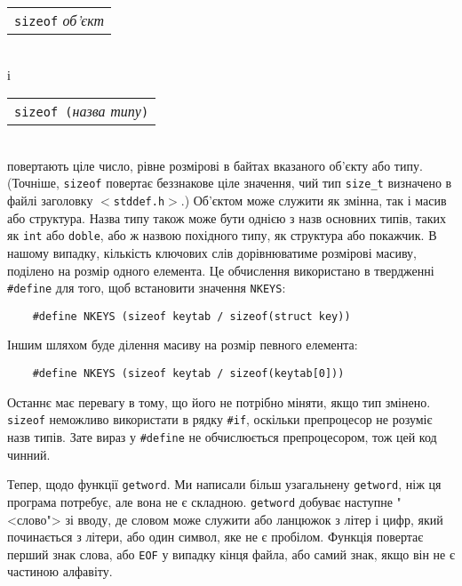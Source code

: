\documentclass[a4paper,12pt]{book}
\begin{document}
  \vspace{12pt}
  \begin{tabular}{l}
  \texttt{sizeof} \textit{об'єкт} \\
  \end{tabular}
  \vspace{12pt}
  \\
  і

  \vspace{12pt}
  \begin{tabular}{l}
  \texttt{sizeof (}\textit{назва типу}\texttt{)}
  \end{tabular}
  \vspace{12pt}
  \\
  повертають ціле число, рівне розмірові в байтах вказаного об'єкту або типу. (Точніше,
  \texttt{sizeof} повертає беззнакове ціле значення, чий тип \texttt{size\_t} визначено в
  файлі заголовку \texttt{\mbox{$<$}stddef.h\mbox{$>$}}.) Об'єктом може служити як змінна,
  так і масив або структура. Назва типу також може бути однією з назв основних типів,
  таких як \texttt{int} або \texttt{doble}, або ж назвою похідного типу, як структура або
  покажчик. В нашому випадку, кількість ключових слів дорівнюватиме розмірові масиву,
  поділено на розмір одного елемента. Це обчислення використано в твердженні
  \texttt{\#define} для того, щоб встановити значення \texttt{NKEYS}:
  \begin{verbatim}
    #define NKEYS (sizeof keytab / sizeof(struct key))
  \end{verbatim}

  Іншим шляхом буде ділення масиву на розмір певного елемента:
  \begin{verbatim}
    #define NKEYS (sizeof keytab / sizeof(keytab[0]))
  \end{verbatim}

  Останнє має перевагу в тому, що його не потрібно міняти, якщо тип змінено.
  \texttt{sizeof} неможливо використати в рядку \texttt{\#if}, оскільки препроцесор не
  розуміє назв типів. Зате вираз у \texttt{\#define} не обчислюється препроцесором, тож цей
  код чинний.

  Тепер, щодо функції \texttt{getword}. Ми написали більш узагальнену \texttt{getword},
  ніж ця програма потребує, але вона не є складною. \texttt{getword} добуває наступне
  "<слово"> зі вводу, де словом може служити або ланцюжок з літер і цифр, який
  починається з літери, або один символ, яке не є пробілом. Функція повертає перший
  знак слова, або \texttt{EOF} у випадку кінця файла, або самий знак, якщо він не є
  частиною алфавіту.
\end{document}

